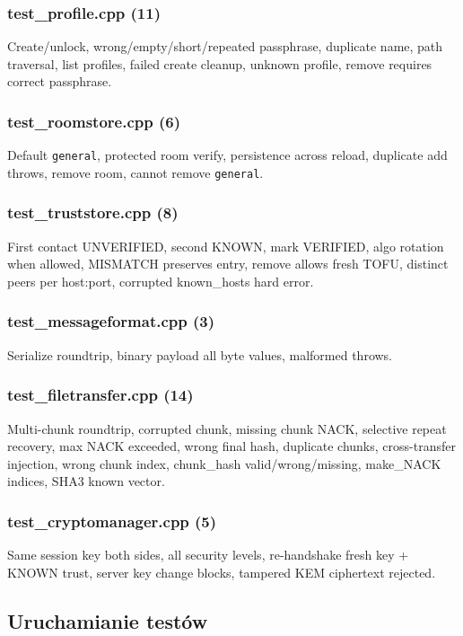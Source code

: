 \documentclass[12pt,a4paper]{article}
\begin{document}
\subsubsection{test\_profile.cpp (11)}
Create/unlock, wrong/empty/short/repeated passphrase, duplicate name, path traversal, list profiles, failed create cleanup, unknown profile, remove requires correct passphrase.

\subsubsection{test\_roomstore.cpp (6)}
Default \texttt{general}, protected room verify, persistence across reload, duplicate add throws, remove room, cannot remove \texttt{general}.

\subsubsection{test\_truststore.cpp (8)}
First contact UNVERIFIED, second KNOWN, mark VERIFIED, algo rotation when allowed, MISMATCH preserves entry, remove allows fresh TOFU, distinct peers per host:port, corrupted known\_hosts hard error.

\subsubsection{test\_messageformat.cpp (3)}
Serialize roundtrip, binary payload all byte values, malformed throws.

\subsubsection{test\_filetransfer.cpp (14)}
Multi-chunk roundtrip, corrupted chunk, missing chunk NACK, selective repeat recovery, max NACK exceeded, wrong final hash, duplicate chunks, cross-transfer injection, wrong chunk index, chunk\_hash valid/wrong/missing, make\_NACK indices, SHA3 known vector.

\subsubsection{test\_cryptomanager.cpp (5)}
Same session key both sides, all security levels, re-handshake fresh key + KNOWN trust, server key change blocks, tampered KEM ciphertext rejected.

\subsection{Uruchamianie testów}
\end{document}
